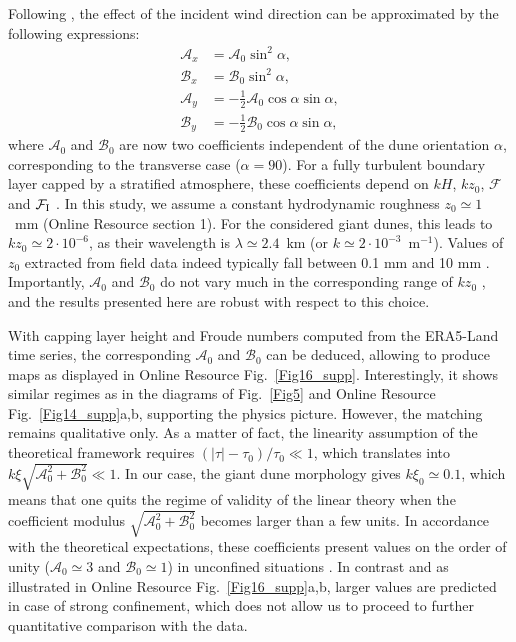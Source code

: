 Following \citet{Andreotti2012}, the effect of the incident wind direction can be approximated by the following expressions:
%
\begin{align}
  \mathcal{A}_{x} & = \mathcal{A}_{0}\sin^{2}\alpha, \\
  \mathcal{B}_{x} & = \mathcal{B}_{0}\sin^{2}\alpha, \\
  \mathcal{A}_{y} & = -\displaystyle\frac{1}{2}\mathcal{A}_{0}\cos\alpha \sin\alpha, \\
  \mathcal{B}_{y} & = -\displaystyle\frac{1}{2}\mathcal{B}_{0}\cos\alpha \sin\alpha,
\end{align}
%
where $\mathcal{A}_{0}$ and $\mathcal{B}_{0}$ are now two coefficients independent of the dune orientation $\alpha$, corresponding to the transverse case ($\alpha=90$). For a fully turbulent boundary layer capped by a stratified atmosphere, these coefficients depend on $k H$, $k z_{0}$, $\mathcal{F}$ and $\mathcal{F}_{\textup{I}}$ \citep{Andreotti2009}. In this study, we assume a constant hydrodynamic roughness $z_{0} \simeq 1$~mm (Online Resource section 1). For the considered giant dunes, this leads to $k z_{0} \simeq 2 \cdot 10^{-6}$, as their wavelength is $\lambda \simeq 2.4$~km (or $k \simeq 2 \cdot 10^{-3}$~m$^{-1}$). Values of $z_{0}$ extracted from field data indeed typically fall between 0.1 mm and 10 mm \citep{Sherman2008, Field2018}. Importantly, $\mathcal{A}_{0}$ and $\mathcal{B}_{0}$ do not vary much in the corresponding range of $k z_{0}$ \citep{Fourriere2010}, and the results presented here are robust with respect to this choice.

With capping layer height and Froude numbers computed from the ERA5-Land time series, the corresponding $\mathcal{A}_{0}$ and $\mathcal{B}_{0}$ can be deduced, allowing to produce maps as displayed in Online Resource Fig.~\ref{Fig16_supp}. Interestingly, it shows similar regimes as in the diagrams of Fig.~\ref{Fig5} and Online Resource Fig.~\ref{Fig14_supp}a,b, supporting the physics picture. However, the matching remains qualitative only. As a matter of fact, the linearity assumption of the theoretical framework requires $\left(\vert \tau \vert - \tau_{0}\right)/\tau_{0} \ll 1$, which translates into $k\xi\sqrt{\mathcal{A}_{0}^{2} + \mathcal{B}_{0}^{2}} \ll 1$. In our case, the giant dune morphology gives $k\xi_0 \simeq 0.1$, which means that one quits the regime of validity of the linear theory when the coefficient modulus $\sqrt{\mathcal{A}_{0}^{2} + \mathcal{B}_{0}^{2}}$ becomes larger than a few units. In accordance with the theoretical expectations, these coefficients present values on the order of unity ($\mathcal{A}_{0} \simeq 3$ and $\mathcal{B}_{0} \simeq 1$) in unconfined situations \citep{Claudin2013, Lu2021}. In contrast and as illustrated in Online Resource Fig.~\ref{Fig16_supp}a,b, larger values are predicted in case of strong confinement, which does not allow us to proceed to further quantitative comparison with the data.

